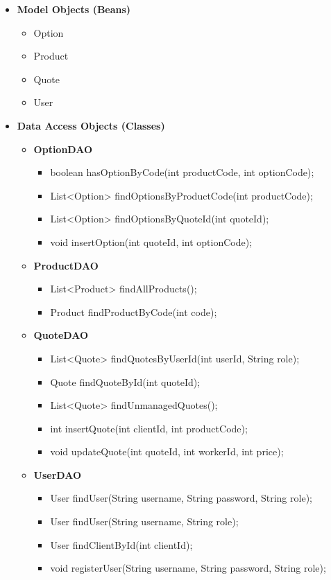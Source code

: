 \documentclass[a4paper, 12pt]{article}
\begin{document}
\begin{itemize}
\item \textbf{Model Objects (Beans)}
\begin{itemize}
\item Option
\item Product
\item Quote
\item User
\end{itemize}
\item \textbf{Data Access Objects (Classes)}
\begin{itemize}
	\item \textbf{OptionDAO}
	\begin{itemize}
		\item boolean hasOptionByCode(int productCode, int optionCode);
		\item List<Option> findOptionsByProductCode(int productCode);
		\item List<Option> findOptionsByQuoteId(int quoteId);
		\item void insertOption(int quoteId, int optionCode);
	\end{itemize}
	\item \textbf{ProductDAO}
	\begin{itemize}
		\item List<Product> findAllProducts();
		\item Product findProductByCode(int code);
	\end{itemize}
	\item \textbf{QuoteDAO}
	\begin{itemize}
		\item List<Quote> findQuotesByUserId(int userId, String role);
		\item Quote findQuoteById(int quoteId);
		\item List<Quote> findUnmanagedQuotes();
		\item int insertQuote(int clientId, int productCode);
		\item void updateQuote(int quoteId, int workerId, int price);
	\end{itemize}
	\item \textbf{UserDAO}
	\begin{itemize}
		\item User findUser(String username, String password, String role);
		\item User findUser(String username, String role);
		\item User findClientById(int clientId);
		\item void registerUser(String username, String password, String role);

\end{itemize}
\end{itemize}
\end{itemize}
\end{document}
